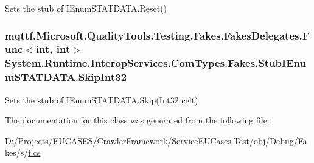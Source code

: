 Sets the stub of I\-Enum\-S\-T\-A\-T\-D\-A\-T\-A.\-Reset()

\hypertarget{class_system_1_1_runtime_1_1_interop_services_1_1_com_types_1_1_fakes_1_1_stub_i_enum_s_t_a_t_d_a_t_a_a0e550a1d32ace9eb74b49555163e8ef3}{
\subsubsection[{Skip\-Int32}]{\setlength{\rightskip}{0pt plus 5cm}mqttf.\-Microsoft.\-Quality\-Tools.\-Testing.\-Fakes.\-Fakes\-Delegates.\-Func$<$int, int$>$ System.\-Runtime.\-Interop\-Services.\-Com\-Types.\-Fakes.\-Stub\-I\-Enum\-S\-T\-A\-T\-D\-A\-T\-A.\-Skip\-Int32}}\label{class_system_1_1_runtime_1_1_interop_services_1_1_com_types_1_1_fakes_1_1_stub_i_enum_s_t_a_t_d_a_t_a_a0e550a1d32ace9eb74b49555163e8ef3}


Sets the stub of I\-Enum\-S\-T\-A\-T\-D\-A\-T\-A.\-Skip(\-Int32 celt)



The documentation for this class was generated from the following file\-:\begin{DoxyCompactItemize}
\item 
D\-:/\-Projects/\-E\-U\-C\-A\-S\-E\-S/\-Crawler\-Framework/\-Service\-E\-U\-Cases.\-Test/obj/\-Debug/\-Fakes/s/\hyperlink{s_2f_8cs}{f.\-cs}\end{DoxyCompactItemize}
